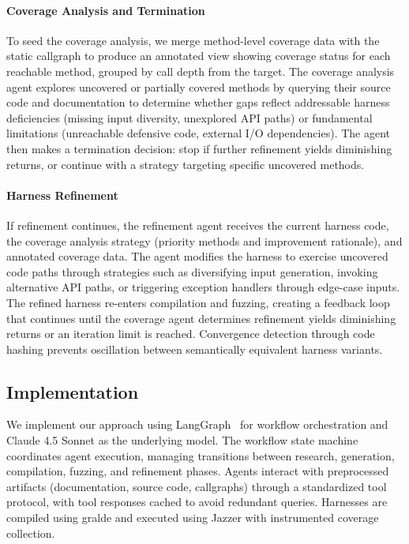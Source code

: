 \paragraph{Coverage Analysis and Termination}
To seed the coverage analysis, we merge method-level coverage data with the static callgraph to produce an annotated view showing coverage status for each reachable method, grouped by call depth from the target. The coverage analysis agent explores uncovered or partially covered methods by querying their source code and documentation to determine whether gaps reflect addressable harness deficiencies (missing input diversity, unexplored API paths) or fundamental limitations (unreachable defensive code, external I/O dependencies). The agent then makes a termination decision: stop if further refinement yields diminishing returns, or continue with a strategy targeting specific uncovered methods.

\paragraph{Harness Refinement}
If refinement continues, the refinement agent receives the current harness code, the coverage analysis strategy (priority methods and improvement rationale), and annotated coverage data. The agent modifies the harness to exercise uncovered code paths through strategies such as diversifying input generation, invoking alternative API paths, or triggering exception handlers through edge-case inputs. The refined harness re-enters compilation and fuzzing, creating a feedback loop that continues until the coverage agent determines refinement yields diminishing returns or an iteration limit is reached. Convergence detection through code hashing prevents oscillation between semantically equivalent harness variants.
\subsection{Implementation}%
\label{subsec:implementation}
We implement our approach using LangGraph~\cite{langgraph2024} for workflow orchestration and Claude 4.5 Sonnet as the underlying model. The workflow state machine coordinates agent execution, managing transitions between research, generation, compilation, fuzzing, and refinement phases. Agents interact with preprocessed artifacts (documentation, source code, callgraphs) through a standardized tool protocol, with tool responses cached to avoid redundant queries. Harnesses are compiled using gralde and executed using Jazzer with instrumented coverage collection.
